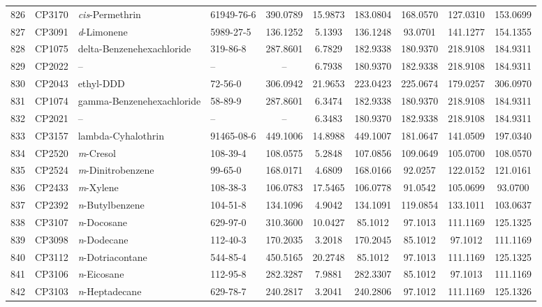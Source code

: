 \begin{longtable}{clllcccccc}
826 & CP3170 & \textit{cis}-Permethrin & 61949-76-6 & 390.0789 & 15.9873 & 183.0804 & 168.0570 & 127.0310 & 153.0699 \\ 
827 & CP3091 & \textit{d}-Limonene & 5989-27-5 & 136.1252 & 5.1393 & 136.1248 & 93.0701 & 141.1277 & 154.1355 \\ 
828 & CP1075 & delta-Benzenehexachloride & 319-86-8 & 287.8601 & 6.7829 & 182.9338 & 180.9370 & 218.9108 & 184.9311 \\ 
829 & CP2022 & – & – & – & 6.7938 & 180.9370 & 182.9338 & 218.9108 & 184.9311 \\ 
830 & CP2043 & ethyl-DDD\smash{\textsuperscript{\textdaggerdbl}} & 72-56-0 & 306.0942 & 21.9653 & 223.0423 & 225.0674 & 179.0257 & 306.0970 \\ 
831 & CP1074 & gamma-Benzenehexachloride\smash{\textsuperscript{\textdaggerdbl}} & 58-89-9 & 287.8601 & 6.3474 & 182.9338 & 180.9370 & 218.9108 & 184.9311 \\ 
832 & CP2021 & – & – & – & 6.3483 & 180.9370 & 182.9338 & 218.9108 & 184.9311 \\ 
833 & CP3157 & lambda-Cyhalothrin & 91465-08-6 & 449.1006 & 14.8988 & 449.1007 & 181.0647 & 141.0509 & 197.0340 \\ 
834 & CP2520 & \textit{m}-Cresol & 108-39-4 & 108.0575 & 5.2848 & 107.0856 & 109.0649 & 105.0700 & 108.0570 \\ 
835 & CP2524 & \textit{m}-Dinitrobenzene & 99-65-0 & 168.0171 & 4.6809 & 168.0166 & 92.0257 & 122.0152 & 121.0161 \\ 
836 & CP2433 & \textit{m}-Xylene & 108-38-3 & 106.0783 & 17.5465 & 106.0778 & 91.0542 & 105.0699 & 93.0700 \\ 
837 & CP2392 & \textit{n}-Butylbenzene & 104-51-8 & 134.1096 & 4.9042 & 134.1091 & 119.0854 & 133.1011 & 103.0637 \\ 
838 & CP3107 & \textit{n}-Docosane & 629-97-0 & 310.3600 & 10.0427 & 85.1012 & 97.1013 & 111.1169 & 125.1325 \\ 
839 & CP3098 & \textit{n}-Dodecane & 112-40-3 & 170.2035 & 3.2018 & 170.2045 & 85.1012 & 97.1012 & 111.1169 \\ 
840 & CP3112 & \textit{n}-Dotriacontane & 544-85-4 & 450.5165 & 20.2748 & 85.1012 & 97.1013 & 111.1169 & 125.1325 \\ 
841 & CP3106 & \textit{n}-Eicosane & 112-95-8 & 282.3287 & 7.9881 & 282.3307 & 85.1012 & 97.1013 & 111.1169 \\ 
842 & CP3103 & \textit{n}-Heptadecane & 629-78-7 & 240.2817 & 3.2041 & 240.2806 & 97.1012 & 111.1169 & 125.1326 \\ 

\end{longtable}
